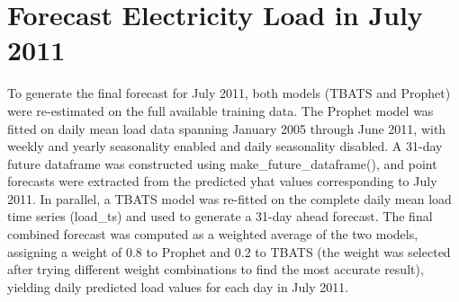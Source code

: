 \documentclass[
]{article}
\begin{document}
\section{Forecast Electricity Load in July
2011}\label{forecast-electricity-load-in-july-2011}

To generate the final forecast for July 2011, both models (TBATS and
Prophet) were re-estimated on the full available training data. The
Prophet model was fitted on daily mean load data spanning January 2005
through June 2011, with weekly and yearly seasonality enabled and daily
seasonality disabled. A 31-day future dataframe was constructed using
make\_future\_dataframe(), and point forecasts were extracted from the
predicted yhat values corresponding to July 2011. In parallel, a TBATS
model was re-fitted on the complete daily mean load time series
(load\_ts) and used to generate a 31-day ahead forecast. The final
combined forecast was computed as a weighted average of the two models,
assigning a weight of 0.8 to Prophet and 0.2 to TBATS (the weight was
selected after trying different weight combinations to find the most
accurate result), yielding daily predicted load values for each day in
July 2011.
\end{document}
